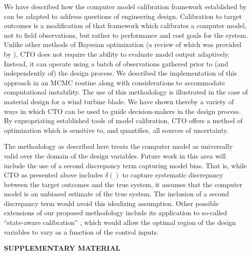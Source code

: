 \documentclass[12pt]{article}
\begin{document}
We have described how the 
computer model calibration framework established by \cite{Kennedy2001} can be adapted to address questions of engineering design. 
%
Calibration to target outcomes is a modification of that framework which calibrates a computer model, not to field observations, but rather to performance and cost goals for the system. 
%
Unlike other methods of Bayesian optimization (a review of which was provided by \citealt{Shahriari2016}), CTO does not require the ability to evaluate model output adaptively.
%
Instead, it can operate using a batch of observations gathered prior to (and independently of) the design process.
%
We described the implementation of this approach in an MCMC routine along with considerations to accommodate computational instability.
%
The use of this methodology is illustrated in the case of material design for a wind turbine blade. 
%
We have shown thereby a variety of ways in which CTO can be used to guide decision-makers in the design process. 
%
By expropriating established tools of model calibration, CTO offers a method of optimization which is sensitive to, and quantifies, all sources of uncertainty.

The methodology as described here treats the computer model as universally valid over the domain of the design variables. 
%
Future work in this area will include the use of a second discrepancy term capturing model bias.
%
That is, while CTO as presented above includes $\delta()$ to capture systematic discrepancy between the target outcomes and the true system, it assumes that the computer model is an unbiased estimate of the true system.
%
The inclusion of a second discrepancy term would avoid this idealizing assumption.
%
Other possible extensions of our proposed methodology include its application to so-called ``state-aware calibration'' \citep{Atamturktur2015,Stevens2018,Brown2016}, which would allow the optimal region of the design variables to vary as a function of the control inputs.



\bigskip
\begin{center}
{\large\bf SUPPLEMENTARY MATERIAL}
\end{center}
\end{document}
